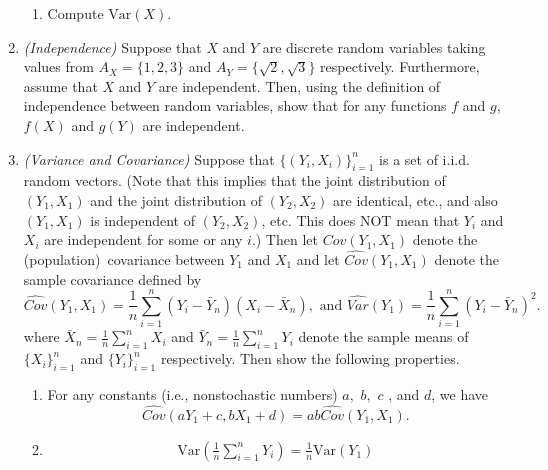 \documentclass[11pt]{article}
\begin{document}
\begin{enumerate}
\begin{enumerate}
	\item Compute $\text{Var}(X)$.
	\end{enumerate}


	\item \textit{(Independence)} Suppose that $X$ and $Y$ are discrete random variables taking values from $A_X=\{1,2,3\}$ and $A_Y=\{\sqrt{2},\sqrt{3}\}$ respectively. Furthermore, assume that $X$ and $Y$ are independent. Then, using the definition of independence between random variables, show that for any functions $f$ and $g$, $f(X)$ and $g(Y)$ are independent.


	\item \textit{(Variance and Covariance) }Suppose that $\{(Y_{i},X_{i})\}_{i=1}^{n}$ is a set of i.i.d. random
	vectors. (Note that this implies that the joint distribution of $%
	(Y_{1},X_{1})$ and the joint distribution of $(Y_{2},X_{2})$ are identical,
	etc., and also $(Y_{1},X_{1})$ is independent of $(Y_{2},X_{2})$, etc. This
	does NOT mean that $Y_{i}$ and $X_{i}$ are independent for some or any $i$.)
	Then let $Cov(Y_{1},X_{1})$ denote the (population)\ covariance between $%
	Y_{1}$ and $X_{1}$ and let $\widehat{Cov}(Y_{1},X_{1})$ denote the sample covariance defined by
	\begin{equation*}
	\widehat{Cov}(Y_{1},X_{1})=\frac{1}{n}\sum_{i=1}^{n}\left( Y_{i}-\bar{Y}%
	_{n}\right) \left( X_{i}-\bar{X}_{n}\right),\text{ and } \widehat{Var}(Y_{1})=\frac{1}{n}\sum_{i=1}^{n}\left( Y_{i}-\bar{Y}
	_{n}\right)^2.
	\end{equation*}
	where $\bar X_n=\frac{1}{n}\sum_{i=1}^n X_i$ and $\bar Y_n=\frac{1}{n}\sum_{i=1}^n Y_i$ denote the sample means of $\{X_i\}_{i=1}^n$ and $\{Y_i\}_{i=1}^n$ respectively. Then show the following properties.
	\begin{enumerate}
	\item  For any constants (i.e., nonstochastic numbers) $a,$ $b,$ $c$%
	, and $d$, we have%
	\begin{equation*}
	\widehat{Cov}(aY_{1}+c,bX_{1}+d)=ab\widehat{Cov}(Y_{1},X_{1}).
	\end{equation*}
	\item  \begin{eqnarray*}
		\text{Var}\left(\frac{1}{n}\sum_{i=1}^{n} Y_i\right) = \frac{1}{n}\text{Var}(Y_1)
	\end{eqnarray*}


\end{enumerate}
\end{enumerate}
\end{document}
